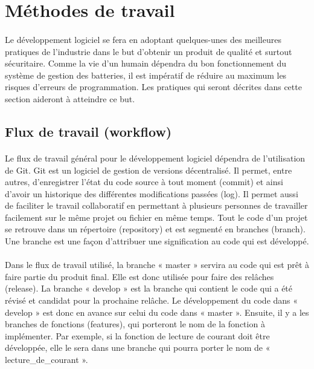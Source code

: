 \section{Méthodes de travail}
	\paragraph{}
	Le développement logiciel se fera en adoptant quelques-unes des meilleures pratiques de l’industrie dans le but d’obtenir un produit de qualité et surtout sécuritaire. Comme la vie d’un humain dépendra du bon fonctionnement du système de gestion des batteries, il est impératif de réduire au maximum les risques d’erreurs de programmation. Les pratiques qui seront décrites dans cette section aideront à atteindre ce but.

	\subsection{Flux de travail (workflow)}
	
		\paragraph{}
		Le flux de travail général pour le développement logiciel dépendra de l’utilisation de Git. Git est un logiciel de gestion de versions décentralisé. Il permet, entre autres, d’enregistrer l’état du code source à tout moment (commit) et ainsi d’avoir un historique des différentes modifications passées (log). Il permet aussi de faciliter le travail collaboratif en permettant à plusieurs personnes de travailler facilement sur le même projet ou fichier en même temps. Tout le code d’un projet se retrouve dans un répertoire (repository) et est segmenté en branches (branch). Une branche est une façon d’attribuer une signification au code qui est développé.
		
		\paragraph{}
		Dans le flux de travail utilisé, la branche « master » servira au code qui est prêt à faire partie du produit final. Elle est donc utilisée pour faire des relâches (release). La branche « develop » est la branche qui contient le code qui a été révisé et candidat pour la prochaine relâche. Le développement du code dans « develop » est donc en avance sur celui du code dans « master ». Ensuite, il y a les branches de fonctions (features), qui porteront le nom de la fonction à implémenter. Par exemple, si la fonction de lecture de courant doit être développée, elle le sera dans une branche qui pourra porter le nom de « lecture\_de\_courant ».
		
